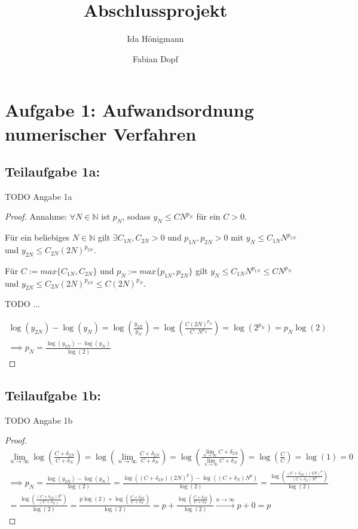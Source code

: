 \documentclass[]{article}
\title{Abschlussprojekt}
\author{Ida Hönigmann \and Fabian Dopf}
\begin{document}
\maketitle

\section*{Aufgabe 1: Aufwandsordnung numerischer Verfahren}
\subsection*{Teilaufgabe 1a:}
TODO Angabe 1a

\begin{proof}
	Annahme: $\forall N \in \mathbb{N}$ ist $p_N$, sodass $y_N \leq C N^{p_N}$ für ein $C > 0$.
	
	Für ein beliebiges $N \in \mathbb{N}$ gilt $\exists C_{1N}, C_{2N} > 0$ und $p_{1N}, p_{2N} > 0$ mit $y_N \leq C_{1N} N^{p_{1N}}$ und $y_{2N} \leq C_{2N} (2N)^{p_{2N}}$.
	
	Für $C:=max\{C_{1N}, C_{2N}\}$ und $p_N:=max\{p_{1N}, p_{2N}\}$ gilt $y_N \leq C_{1N} N^{p_{1N}} \leq C N^{p_N}$ und $y_{2N} \leq C_{2N} (2N)^{p_{2N}} \leq C (2N)^{p_N}$.
	 
	 TODO ...
	 
	\begin{align*}
		\log(y_{2N}) - \log(y_N) = \log\left(\frac{y_{2N}}{y_N}\right) = \log\left(\frac{C(2N)^{p_N}}{C\cdot N^{p_N}}\right) = \log(2^{p_N}) = p_N \log(2) \\
		\implies p_N = \frac{\log(y_{2N}) - \log(y_N)}{\log(2)}
	\end{align*}
\end{proof}

\subsection*{Teilaufgabe 1b:}
TODO Angabe 1b

\begin{proof}
	
	\begin{align*}
		\lim\limits_{n\rightarrow\infty} \log\left(\frac{C+\delta_{2N}}{C+\delta_N}\right) = \log\left(\lim\limits_{n\rightarrow\infty}\frac{C+\delta_{2N}}{C+\delta_N}\right) = \log\left(\frac{\lim\limits_{n\rightarrow\infty}C+\delta_{2N}}{\lim\limits_{n\rightarrow\infty}C+\delta_N}\right) = \log\left(\frac{C}{C}\right) = \log(1) = 0\\
		\implies
		p_N = \frac{\log(y_{2N}) - \log(y_N)}{\log(2)} = \frac{\log((C+\delta_{2N})(2N)^p) - \log((C+\delta_N)N^p)}{\log(2)} = \frac{\log\left(\frac{(C+\delta_{2N})(2N)^p}{(C+\delta_N)N^p}\right)}{\log(2)} \\
		= \frac{\log\left(\frac{(C+\delta_{2N})2^p}{(C+\delta_N)}\right)}{\log(2)} = \frac{p \log(2) + \log\left(\frac{C+\delta_{2N}}{C+\delta_N}\right)}{\log(2)} = p + \frac{\log\left(\frac{C+\delta_{2N}}{C+\delta_N}\right)}{\log(2)} \xrightarrow{n\rightarrow\infty} p + 0 = p		
	\end{align*}
\end{proof}
\end{document}
